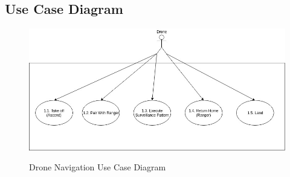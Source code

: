 \subsection{Use Case Diagram}
\begin{center}
	\begin{flushleft}
		\begin{figure}[h!]
			\centering
			\includegraphics[scale=0.5]{./assets/images/navigation-ucd.jpg}
			\label{fig: object-recognition-ucd }
			\caption{Drone Navigation Use Case Diagram}
		\end{figure}

	\end{flushleft}
\end{center}
